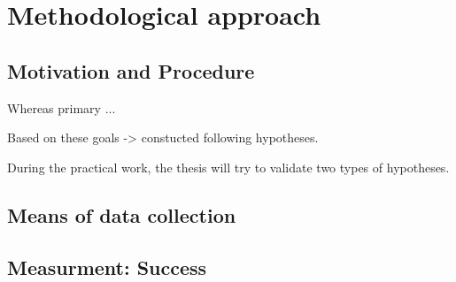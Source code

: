 \chapter{Methodological approach}

\section{Motivation and Procedure}





Whereas primary ...





Based on these goals -> constucted following hypotheses.

During the practical work, 
	the thesis will try to validate two types of hypotheses.



\section{Means of data collection}

\section{Measurment: Success}

